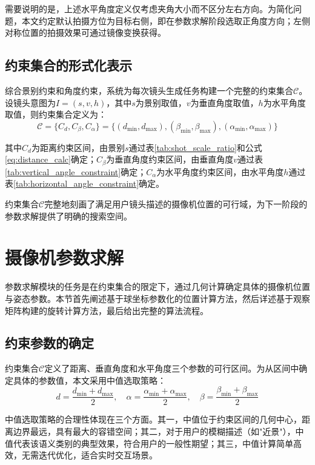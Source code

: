 需要说明的是，上述水平角度定义仅考虑夹角大小而不区分左右方向。为简化问题，本文约定默认拍摄方位为目标右侧，即在参数求解阶段选取正角度方向；左侧对称位置的拍摄效果可通过镜像变换获得。

\subsection{约束集合的形式化表示}

综合景别约束和角度约束，系统为每次镜头生成任务构建一个完整的约束集合$\mathcal{C}$。设镜头意图为$I = (s, v, h)$，其中$s$为景别取值，$v$为垂直角度取值，$h$为水平角度取值，则约束集合定义为：
\begin{equation}
\mathcal{C} = \{C_d, C_\beta, C_\alpha\} = \{(d_{\min}, d_{\max}), (\beta_{\min}, \beta_{\max}), (\alpha_{\min}, \alpha_{\max})\}
\label{eq:constraint_set}
\end{equation}

其中$C_d$为距离约束区间，由景别$s$通过表\ref{tab:shot_scale_ratio}和公式\ref{eq:distance_calc}确定；$C_\beta$为垂直角度约束区间，由垂直角度$v$通过表\ref{tab:vertical_angle_constraint}确定；$C_\alpha$为水平角度约束区间，由水平角度$h$通过表\ref{tab:horizontal_angle_constraint}确定。

约束集合$\mathcal{C}$完整地刻画了满足用户镜头描述的摄像机位置的可行域，为下一阶段的参数求解提供了明确的搜索空间。

\section{摄像机参数求解}

参数求解模块的任务是在约束集合的限定下，通过几何计算确定具体的摄像机位置与姿态参数。本节首先阐述基于球坐标参数化的位置计算方法，然后详述基于观察矩阵构建的旋转计算方法，最后给出完整的算法流程。

\subsection{约束参数的确定}

约束集合$\mathcal{C}$定义了距离、垂直角度和水平角度三个参数的可行区间。为从区间中确定具体的参数值，本文采用中值选取策略：
\begin{equation}
d = \frac{d_{\min} + d_{\max}}{2}, \quad
\alpha = \frac{\alpha_{\min} + \alpha_{\max}}{2}, \quad
\beta = \frac{\beta_{\min} + \beta_{\max}}{2}
\end{equation}

中值选取策略的合理性体现在三个方面。其一，中值位于约束区间的几何中心，距离边界最远，具有最大的容错空间；其二，对于用户的模糊描述（如"近景"），中值代表该语义类别的典型效果，符合用户的一般性期望；其三，中值计算简单高效，无需迭代优化，适合实时交互场景。

